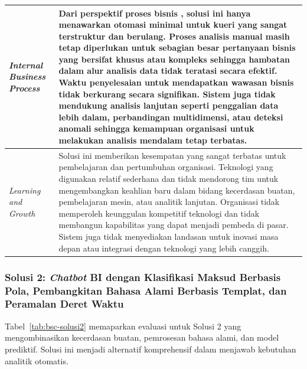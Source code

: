 \begin{longtable}{|p{3.5cm}|p{9cm}|}
\textit{Internal Business Process} & Dari perspektif proses bisnis , solusi ini hanya menawarkan otomasi minimal untuk kueri yang sangat terstruktur dan berulang. Proses analisis manual masih tetap diperlukan untuk sebagian besar pertanyaan bisnis yang bersifat khusus atau kompleks sehingga hambatan dalam alur analisis data tidak teratasi secara efektif. Waktu penyelesaian untuk mendapatkan wawasan bisnis tidak berkurang secara signifikan. Sistem juga tidak mendukung analisis lanjutan seperti penggalian data lebih dalam, perbandingan multidimensi, atau deteksi anomali sehingga kemampuan organisasi untuk melakukan analisis mendalam tetap terbatas. \\
\hline

\textit{Learning and Growth} & Solusi ini memberikan kesempatan yang sangat terbatas untuk pembelajaran dan pertumbuhan organisasi. Teknologi yang digunakan relatif sederhana dan tidak mendorong tim untuk mengembangkan keahlian baru dalam bidang kecerdasan buatan, pembelajaran mesin, atau analitik lanjutan. Organisasi tidak memperoleh keunggulan kompetitif teknologi dan tidak membangun kapabilitas yang dapat menjadi pembeda di pasar. Sistem juga tidak menyediakan landasan untuk inovasi masa depan atau integrasi dengan teknologi yang lebih canggih. \\
\hline

\end{longtable}

\subsubsection{Solusi 2: \textit{Chatbot} BI dengan Klasifikasi Maksud Berbasis Pola, Pembangkitan Bahasa Alami Berbasis Templat, dan Peramalan Deret Waktu}

Tabel~\ref{tab:bsc-solusi2} memaparkan evaluasi untuk Solusi 2 yang mengombinasikan kecerdasan buatan, pemrosesan bahasa alami, dan model prediktif. Solusi ini menjadi alternatif komprehensif dalam menjawab kebutuhan analitik otomatis.

